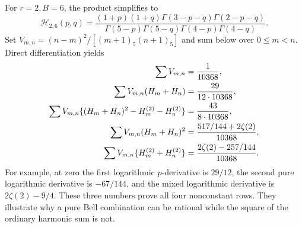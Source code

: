 For $r=2,B=6$, the product simplifies to
\begin{equation}\label{dhr:eq:H26}
 \mathcal H_{2,6}(p,q)=
 \frac{(1+p)(1+q)\Gamma(3-p-q)\Gamma(2-p-q)}
 {\Gamma(5-p)\Gamma(5-q)\Gamma(4-p)\Gamma(4-q)}.
\end{equation}
Set $V_{m,n}=(n-m)^2/[(m+1)_5(n+1)_5]$ and sum below over
$0\leq m<n$. Direct differentiation yields
\begin{align}
 \sum V_{m,n}&=\frac1{10368},\notag\\
 \sum V_{m,n}(H_m+H_n)&=\frac{29}{12\cdot10368},\notag\\
 \sum V_{m,n}\{(H_m+H_n)^2-H_m^{(2)}-H_n^{(2)}\}
 &=\frac{43}{8\cdot10368},\notag\\
 \sum V_{m,n}(H_m+H_n)^2
 &=\frac{517/144+2\zeta(2)}{10368},\notag\\
 \sum V_{m,n}\{H_m^{(2)}+H_n^{(2)}\}
 &=\frac{2\zeta(2)-257/144}{10368}.
 \label{dhr:eq:ordinary-examples}
\end{align}
For example, at zero the first logarithmic $p$-derivative is $29/12$,
the second pure logarithmic derivative is $-67/144$, and the mixed
logarithmic derivative is $2\zeta(2)-9/4$. These three numbers prove
all four nonconstant rows. They illustrate why a pure Bell combination
can be rational while the square of the ordinary harmonic sum is not.
